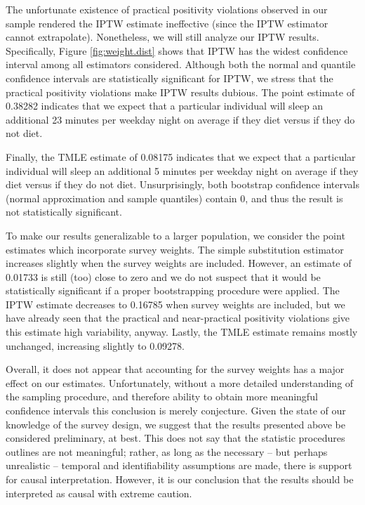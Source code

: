 \documentclass{article}
\begin{document}
The unfortunate existence of practical positivity violations observed in our sample rendered the IPTW estimate ineffective (since the IPTW estimator cannot extrapolate). Nonetheless, we will still analyze our IPTW results. Specifically, Figure \ref{fig:weight.dist} shows that IPTW has the widest confidence interval among all estimators considered. Although both the normal and quantile confidence intervals are statistically significant for IPTW, we stress that the practical positivity violations make IPTW results dubious. The point estimate of 0.38282 indicates that we expect that a particular individual will sleep an additional 23 minutes per weekday night on average if they diet versus if they do not diet.

Finally, the TMLE estimate of 0.08175 indicates that we expect that a particular individual will sleep an additional 5 minutes per weekday night on average if they diet versus if they do not diet. Unsurprisingly, both bootstrap confidence intervals (normal approximation and sample quantiles) contain $0$, and thus the result is not statistically significant.

To make our results generalizable to a larger population, we consider the point estimates which incorporate survey weights. The simple substitution estimator increases slightly when the survey weights are included. However, an estimate of 0.01733 is still (too) close to zero and we do not suspect that it would be statistically significant if a proper bootstrapping procedure were applied. The IPTW estimate decreases to 0.16785 when survey weights are included, but we have already seen that the practical and near-practical positivity violations give this estimate high variability, anyway. Lastly, the TMLE estimate remains mostly unchanged, increasing slightly to 0.09278. 

Overall, it does not appear that accounting for the survey weights has a major effect on our estimates. Unfortunately, without a more detailed understanding of the sampling procedure, and therefore ability to obtain more meaningful confidence intervals this conclusion is merely conjecture. Given the state of our knowledge of the survey design, we suggest that the results presented above be considered preliminary, at best. This does not say that the statistic procedures outlines are not meaningful; rather, as long as the necessary -- but perhaps unrealistic -- temporal and identifiability assumptions are made, there is support for causal interpretation. However, it is our conclusion that the results should be interpreted as causal with extreme caution.
\end{document}
